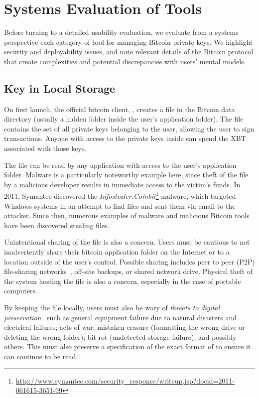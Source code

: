 
\section{Systems Evaluation of Tools} 

Before turning to a detailed usability evaluation, we evaluate from a systems perspective each category of tool for managing Bitcoin private keys. We highlight security and deployability issues, and note relevant details of the Bitcoin protocol that create complexities and potential discrepancies with users' mental models.

\subsection{Key in Local Storage}
On first launch, the official bitcoin client, \bitcoinclient, creates a \walletfile file in the Bitcoin data directory (usually a hidden folder inside the user's application folder). The \walletfile file contains the set of all private keys belonging to the user, allowing the user to sign transactions. Anyone with access to the private keys inside \walletfile can spend the XBT associated with those keys.

The \walletfile file can be read by any application with access to the user's application folder. Malware is a particularly noteworthy example here, since theft of the \walletfile file by a malicious developer results in immediate access to the victim's funds. In 2011, Symantec discovered the \textit{Infostealer.Coinbit}\footnote{\url{http://www.symantec.com/security_response/writeup.jsp?docid=2011-061615-3651-99}} malware, which targeted Windows systems in an attempt to find \walletfile files and sent them via email to the attacker. Since then, numerous examples of malware and malicious Bitcoin tools have been discovered stealing \walletfile files. 

Unintentional sharing of the \walletfile file is also a concern. Users must be cautious to not inadvertently share their bitcoin application folder on the Internet or to a location outside of the user's control. Possible sharing includes peer to peer (P2P) file-sharing networks~\cite{}, off-site backups, or shared network drive. Physical theft of the system hosting the \walletfile file is also a concern, especially in the case of portable computers.

By keeping the \walletfile file locally, users must also be wary of \textit{threats to digital preservation}~\cite{BKM05} such as general equipment failure due to natural disasters and electrical failures; acts of war; mistaken erasure (\eg formatting the wrong drive or deleting the wrong folder); bit rot (\ie undetected storage failure); and possibly others. This must also preserve a specification of the exact format of \walletfile to ensure it can continue to be read. 

